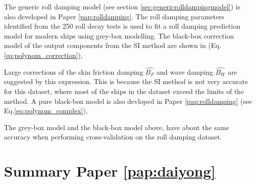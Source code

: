 The generic roll damping model (see section \ref{sec:genericrolldampingmodel}) is also developed in Paper \ref{pap:rolldamping}. The roll damping parameters identified from the 250 roll decay tests is used to fit a roll damping prediction model for modern ships using grey-box modelling. The black-box correction model of the output components from the SI method are shown in (Eq.\ref{eq:polynom_correction}),


\noindent Large corrections of the skin friction damping $\hat{B_F}$ and wave damping $\hat{B_W}$ are suggested by this expression. This is because the SI method is not very accurate for this dataset, where most of the ships in the dataset exceed the limits of the method. A pure black-box model is also devloped in Paper \ref{pap:rolldamping} (see Eq.\ref{eq:polynom_complex}),


\noindent The grey-box model and the black-box model above, have about the same accuracy when performing cross-validation on the roll damping dataset.

\section{Summary Paper \ref{pap:daiyong}}
